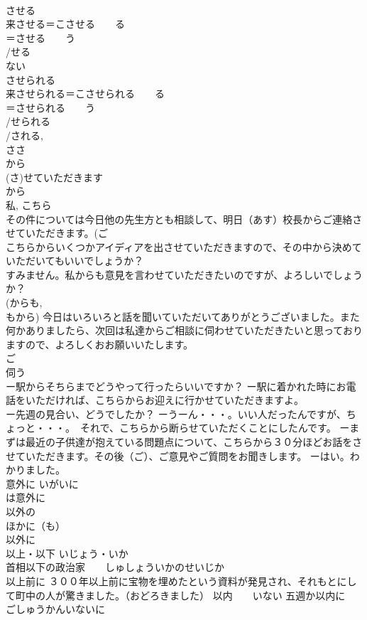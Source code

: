 \documentclass[8pt]{extreport}
\begin{document}
\begin{CJK}{UTF8}{min}
\\	させる	
\\	来させる＝こさせる　　る
\\	＝させる　　う
\\	/せる 
\\	ない 
\\	させられる 
\\	来させられる＝こさせられる　　る
\\	＝させられる　　う
\\	/せられる　
\\	/される, 
\\	ささ 
\\	から
\\	(さ)せていただきます 
\\	から 
\\	私, こちら 
\\	その件については今日他の先生方とも相談して、明日（あす）校長からご連絡させていただきます。(ご 
\\	こちらからいくつかアイディアを出させていただきますので、その中から決めていただいてもいいでしょうか？ 
\\	すみません。私からも意見を言わせていただきたいのですが、よろしいでしょうか？ 
\\	(からも, 
\\	もから) 今日はいろいろと話を聞いていただいてありがとうございました。また何かありましたら、次回は私達からご相談に伺わせていただきたいと思っておりますので、よろしくおお願いいたします。 
\\	ご 
\\	伺う 
\\	ー駅からそちらまでどうやって行ったらいいですか？ ー駅に着かれた時にお電話をいただければ、こちらからお迎えに行かせていただきますよ。 
\\	ー先週の見合い、どうでしたか？ ーうーん・・・。いい人だったんですが、ちょっと・・・。　それで、こちらから断らせていただくことにしたんです。 ーまずは最近の子供達が抱えている問題点について、こちらから３０分ほどお話をさせていただきます。その後（ご）、ご意見やご質問をお聞きします。 ーはい。わかりました。
\\	意外に	いがいに 
\\	は意外に
\\	以外の
\\	ほかに（も） 
\\	以外に
\\	以上・以下 いじょう・いか 
\\	首相以下の政治家　　しゅしょういかのせいじか 
\\	以上前に ３００年以上前に宝物を埋めたという資料が発見され、それもとにして町中の人が驚きました。（おどろきました） 以内　　いない 五週か以内に　　ごしゅうかんいないに 

\end{CJK}
\end{document}
